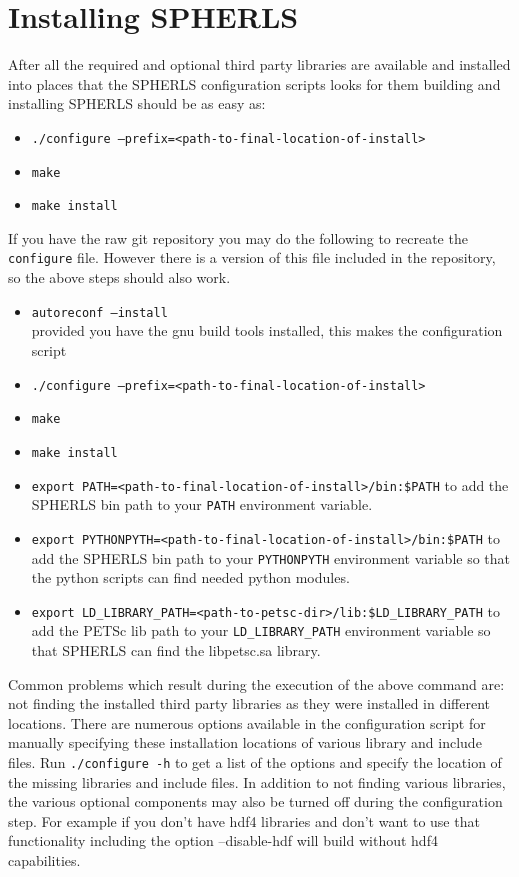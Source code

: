 \documentclass[12pt,a4paper]{book}
\begin{document}
\section{Installing SPHERLS}
After all the required and optional third party libraries are available and installed into places that the SPHERLS configuration scripts looks for them building and installing SPHERLS should be as easy as:
\begin{itemize}
\item {\tt ./configure --prefix=<path-to-final-location-of-install>}
\item {\tt make}
\item {\tt make install}
\end{itemize}
If you have the raw git repository you may do the following to recreate the {\tt configure} file. However there is a version of this file included in the repository, so the above steps should also work.
\begin{itemize}
\item {\tt autoreconf --install} \\provided you have the gnu build tools installed, this makes the configuration script
\item {\tt ./configure --prefix=<path-to-final-location-of-install>}
\item {\tt make}
\item {\tt make install}
\item {\tt export PATH=<path-to-final-location-of-install>/bin:\$PATH} to add the SPHERLS bin path to your {\tt PATH} environment variable.
\item {\tt export PYTHONPYTH=<path-to-final-location-of-install>/bin:\$PATH} to add the SPHERLS bin path to your {\tt PYTHONPYTH} environment variable so that the python scripts can find needed python modules.
\item {\tt export LD\_LIBRARY\_PATH=<path-to-petsc-dir>/lib:\$LD\_LIBRARY\_PATH} to add the PETSc lib path to your {\tt LD\_LIBRARY\_PATH} environment variable so that SPHERLS can find the libpetsc.sa library.
\end{itemize}
Common problems which result during the execution of the above command are: not finding the installed third party libraries as they were installed in different locations. There are numerous options available in the configuration script for manually specifying these installation locations of various library and include files. Run {\tt ./configure -h} to get a list of the options and specify the location of the missing libraries and include files. In addition to not finding various libraries, the various optional components may also be turned off during the configuration step. For example if you don't have hdf4 libraries and don't want to use that functionality including the option --disable-hdf will build without hdf4 capabilities.
\end{document}
